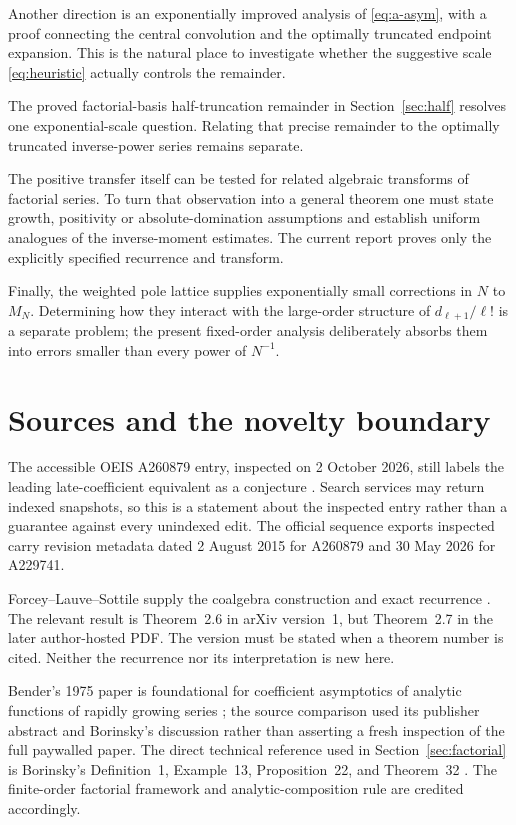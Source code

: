 \documentclass[11pt,letterpaper]{article}
\numberwithin{equation}{section}
\theoremstyle{remark}\newtheorem{remark}[theorem]{Remark}
\begin{document}
Another direction is an exponentially improved analysis of \eqref{eq:a-asym}, with a proof connecting the central convolution and the optimally truncated endpoint expansion. This is the natural place to investigate whether the suggestive scale \eqref{eq:heuristic} actually controls the remainder.

The proved factorial-basis half-truncation remainder in Section~\ref{sec:half} resolves one exponential-scale question. Relating that precise remainder to the optimally truncated inverse-power series remains separate.

The positive transfer itself can be tested for related algebraic transforms of factorial series. To turn that observation into a general theorem one must state growth, positivity or absolute-domination assumptions and establish uniform analogues of the inverse-moment estimates. The current report proves only the explicitly specified recurrence and transform.

Finally, the weighted pole lattice supplies exponentially small corrections in $N$ to $M_N$. Determining how they interact with the large-order structure of $d_{\ell+1}/\ell!$ is a separate problem; the present fixed-order analysis deliberately absorbs them into errors smaller than every power of $N^{-1}$.

\section{Sources and the novelty boundary}
\label{sec:sources}
The accessible OEIS A260879 entry, inspected on 2 October 2026, still labels the leading late-coefficient equivalent as a conjecture \cite{oeis260}. Search services may return indexed snapshots, so this is a statement about the inspected entry rather than a guarantee against every unindexed edit. The official sequence exports inspected carry revision metadata dated 2 August 2015 for A260879 and 30 May 2026 for A229741.

Forcey--Lauve--Sottile supply the coalgebra construction and exact recurrence \cite{fls}. The relevant result is Theorem~2.6 in arXiv version~1, but Theorem~2.7 in the later author-hosted PDF. The version must be stated when a theorem number is cited. Neither the recurrence nor its interpretation is new here.

Bender's 1975 paper is foundational for coefficient asymptotics of analytic functions of rapidly growing series \cite{bender}; the source comparison used its publisher abstract and Borinsky's discussion rather than asserting a fresh inspection of the full paywalled paper. The direct technical reference used in Section~\ref{sec:factorial} is Borinsky's Definition~1, Example~13, Proposition~22, and Theorem~32 \cite{borinsky}. The finite-order factorial framework and analytic-composition rule are credited accordingly.
\end{document}
